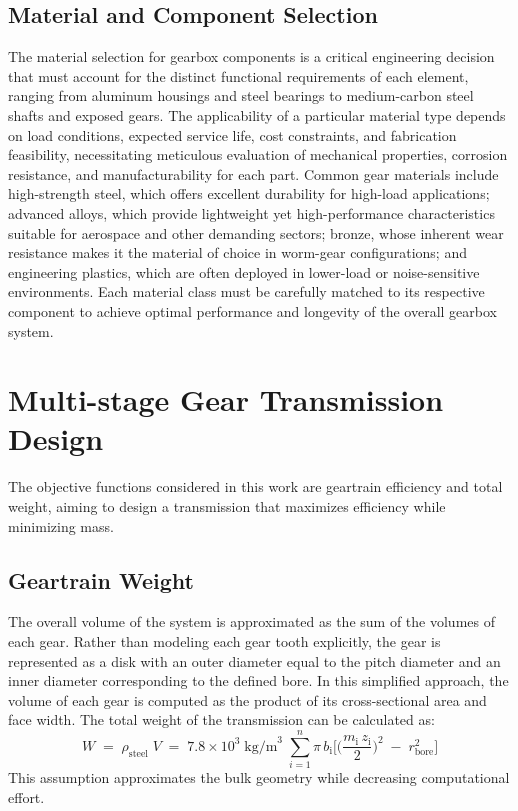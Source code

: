     \subsection{Material and Component Selection}
        The material selection for gearbox components is a critical engineering decision that must account 
        for the distinct functional requirements of each element, ranging from aluminum housings and steel 
        bearings to medium-carbon steel shafts and exposed gears. The applicability of a particular material 
        type depends on load conditions, expected service life, cost constraints, and fabrication feasibility, 
        necessitating meticulous evaluation of mechanical properties, corrosion resistance, and manufacturability 
        for each part. Common gear materials include high-strength steel, which offers excellent durability 
        for high-load applications; advanced alloys, which provide lightweight yet high-performance 
        characteristics suitable for aerospace and other demanding sectors; bronze, whose inherent 
        wear resistance makes it the material of choice in worm-gear configurations; and engineering plastics, 
        which are often deployed in lower-load or noise-sensitive environments. Each material 
        class must be carefully matched to its respective component to achieve optimal performance and 
        longevity of the overall gearbox system.

\section{Multi-stage Gear Transmission Design}
    The objective functions considered in this work are geartrain efficiency and total weight, 
    aiming to design a transmission that maximizes efficiency while minimizing mass.

    \subsection{Geartrain Weight}
        The overall volume of the system is approximated as the sum of the volumes of each gear. Rather than 
        modeling each gear tooth explicitly, the gear is represented as a disk with an outer diameter equal 
        to the pitch diameter and an inner diameter corresponding to the defined bore. In this simplified 
        approach, the volume of each gear is computed as the product of its cross-sectional area and face width. 
        The total weight of the transmission can be calculated as:
            \begin{equation}
                \label{eq:geartrainweight}
                W \;=\; \rho_{\text{steel}}\;V
                \;=\; 7.8\times10^{3}\;\text{kg/m}^{3}\;
                \sum_{i=1}^{n}\pi\,b_{\text{i}}
                \Bigg[\Big(\frac{m_{\text{i}}\,z_{\text{i}}}{2}\Big)^{2}
                \;-\; r_{\text{bore}}^{2}\Bigg]
            \end{equation}
        This assumption approximates the bulk geometry while decreasing computational effort. 

